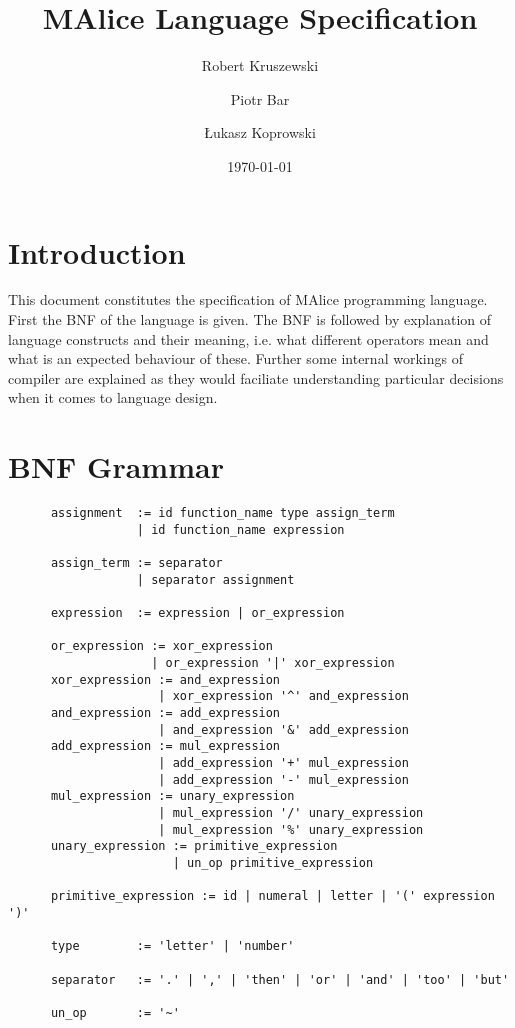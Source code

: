 \documentclass[a4wide, 11pt]{article}
\begin{document}
\title{MAlice Language Specification}

\author{Robert Kruszewski \and Piotr Bar \and Łukasz Koprowski}


\date{\today}         %

\maketitle            %

\section{Introduction}

This document constitutes the specification of MAlice programming language.
First the BNF of the language is given. The BNF is followed by explanation
of language constructs and their meaning, i.e. what different operators mean
and what is an expected behaviour of these. Further some internal workings of compiler
are explained as they would faciliate understanding particular decisions when
it comes to language design.

\section{BNF Grammar} 

\begin{verbatim}
      assignment  := id function_name type assign_term
                  | id function_name expression 

      assign_term := separator
                  | separator assignment

      expression  := expression | or_expression

      or_expression := xor_expression
                    | or_expression '|' xor_expression
      xor_expression := and_expression
                     | xor_expression '^' and_expression 
      and_expression := add_expression
                     | and_expression '&' add_expression
      add_expression := mul_expression
                     | add_expression '+' mul_expression
                     | add_expression '-' mul_expression
      mul_expression := unary_expression
                     | mul_expression '/' unary_expression
                     | mul_expression '%' unary_expression
      unary_expression := primitive_expression
                       | un_op primitive_expression

      primitive_expression := id | numeral | letter | '(' expression ')'

      type        := 'letter' | 'number'

      separator   := '.' | ',' | 'then' | 'or' | 'and' | 'too' | 'but'

      un_op       := '~'
\end{verbatim}
\end{document}
